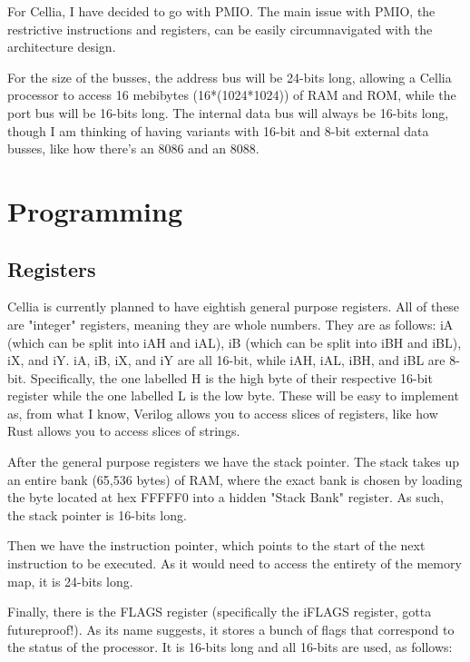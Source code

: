 \documentclass[letterpaper,12pt]{book}
\begin{document}
For Cellia, I have decided to go with PMIO. The main issue with PMIO, the restrictive instructions and registers, can be easily circumnavigated with the architecture design.

For the size of the busses, the address bus will be 24-bits long, allowing a Cellia processor to access 16 mebibytes (16*(1024*1024)) of RAM and ROM, while the port bus will be 16-bits long. The internal data bus will always be 16-bits long, though I am thinking of having variants with 16-bit and 8-bit external data busses, like how there's an 8086 and an 8088.

\part{Programming}

\chapter{Registers}

Cellia is currently planned to have eightish general purpose registers. All of these are "integer" registers, meaning they are whole numbers. They are as follows: iA (which can be split into iAH and iAL), iB (which can be split into iBH and iBL), iX, and iY. iA, iB, iX, and iY are all 16-bit, while iAH, iAL, iBH, and iBL are 8-bit. Specifically, the one labelled H is the high byte of their respective 16-bit register while the one labelled L is the low byte. These will be easy to implement as, from what I know, Verilog allows you to access slices of registers, like how Rust allows you to access slices of strings.

After the general purpose registers we have the stack pointer. The stack takes up an entire bank (65,536 bytes) of RAM, where the exact bank is chosen by loading the byte located at hex FFFFF0 into a hidden "Stack Bank" register. As such, the stack pointer is 16-bits long.

Then we have the instruction pointer, which points to the start of the next instruction to be executed. As it would need to access the entirety of the memory map, it is 24-bits long.

Finally, there is the FLAGS register (specifically the iFLAGS register, gotta futureproof!). As its name suggests, it stores a bunch of flags that correspond to the status of the processor. It is 16-bits long and all 16-bits are used, as follows:
\end{document}
